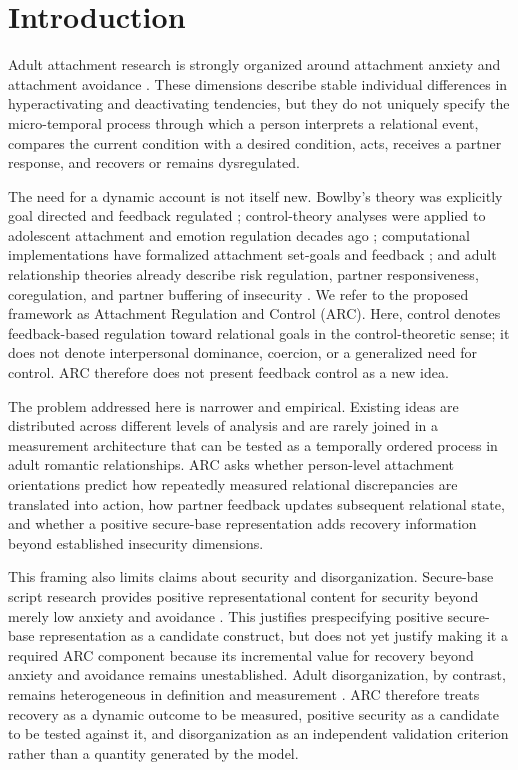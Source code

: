 \section{Introduction}

Adult attachment research is strongly organized around attachment anxiety and attachment avoidance \parencite{fraley2000irt,mikulincer2016attachment,li2012meta}. These dimensions describe stable individual differences in hyperactivating and deactivating tendencies, but they do not uniquely specify the micro-temporal process through which a person interprets a relational event, compares the current condition with a desired condition, acts, receives a partner response, and recovers or remains dysregulated.

The need for a dynamic account is not itself new. Bowlby's theory was explicitly goal directed and feedback regulated \parencite{bowlby1982attachment}; control-theory analyses were applied to adolescent attachment and emotion regulation decades ago \parencite{kobak1993control}; computational implementations have formalized attachment set-goals and feedback \parencite{petters2019control,gagliardi2022control,stevens2009dynamic}; and adult relationship theories already describe risk regulation, partner responsiveness, coregulation, and partner buffering of insecurity \parencite{murray2006risk,sbarra2008coregulation,simpson2014buffering,overall2022buffering}. We refer to the proposed framework as Attachment Regulation and Control (ARC). Here, control denotes feedback-based regulation toward relational goals in the control-theoretic sense; it does not denote interpersonal dominance, coercion, or a generalized need for control. ARC therefore does not present feedback control as a new idea.

The problem addressed here is narrower and empirical. Existing ideas are distributed across different levels of analysis and are rarely joined in a measurement architecture that can be tested as a temporally ordered process in adult romantic relationships. ARC asks whether person-level attachment orientations predict how repeatedly measured relational discrepancies are translated into action, how partner feedback updates subsequent relational state, and whether a positive secure-base representation adds recovery information beyond established insecurity dimensions.

This framing also limits claims about security and disorganization. Secure-base script research provides positive representational content for security beyond merely low anxiety and avoidance \parencite{waters2006workingmodels,waters2019securebase,waters2025securebase}. This justifies prespecifying positive secure-base representation as a candidate construct, but does not yet justify making it a required ARC component because its incremental value for recovery beyond anxiety and avoidance remains unestablished. Adult disorganization, by contrast, remains heterogeneous in definition and measurement \parencite{pollard2023disorganized}. ARC therefore treats recovery as a dynamic outcome to be measured, positive security as a candidate to be tested against it, and disorganization as an independent validation criterion rather than a quantity generated by the model.


